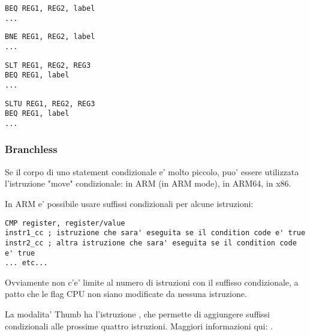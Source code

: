 \begin{lstlisting}[caption=Check for equal values,style=customasmMIPS]
BEQ REG1, REG2, label
...
\end{lstlisting}

\begin{lstlisting}[caption=Check for non-equal values,style=customasmMIPS]
BNE REG1, REG2, label
...
\end{lstlisting}

\begin{lstlisting}[caption=Check for less than (signed),style=customasmMIPS]
SLT REG1, REG2, REG3
BEQ REG1, label
...
\end{lstlisting}

\begin{lstlisting}[caption=Check for less than (unsigned),style=customasmMIPS]
SLTU REG1, REG2, REG3
BEQ REG1, label
...
\end{lstlisting}

\subsubsection{Branchless}

Se il corpo di uno statement condizionale e' molto piccolo, puo' essere utilizzata l'istruzione "move" condizionale: 
 in ARM (in ARM mode),  in ARM64,  in x86.


In ARM e' possibile usare suffissi condizionali per alcune istruzioni:

\begin{lstlisting}[caption=ARM (\ARMMode),style=customasmARM]
CMP register, register/value
instr1_cc ; istruzione che sara' eseguita se il condition code e' true
instr2_cc ; altra istruzione che sara' eseguita se il condition code e' true
... etc...
\end{lstlisting}

Ovviamente non c'e' limite al numero di istruzioni con il suffisso condizionale, a patto che le flag CPU non siano modificate da nessuna istruzione. 


La modalita' Thumb ha l'istruzione , che permette di aggiungere suffissi condizionali alle prossime quattro istruzioni.
Maggiori informazioni qui: .

